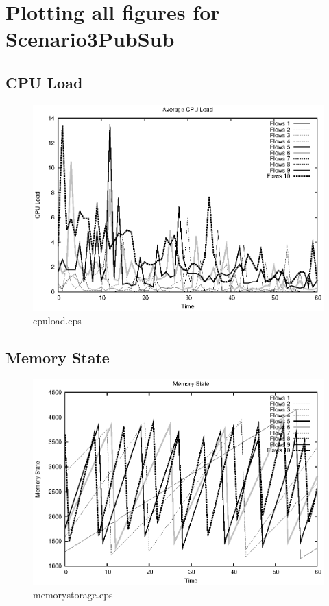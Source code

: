 \documentclass{elsart}
\begin{document}
\section{Plotting all figures for Scenario3PubSub}
\subsection{CPU Load}

\begin{figure}[ht]
\centering
\includegraphics{Scenario3PubSub/cpuload.eps}
\caption{cpuload.eps}\label{fig:cpuload}
\end{figure}

\clearpage
\subsection{Memory State}

\begin{figure}[ht]
\centering
\includegraphics{Scenario3PubSub/memorystorage.eps}
\caption{memorystorage.eps}\label{fig:memorystorage}
\end{figure}
\end{document}
